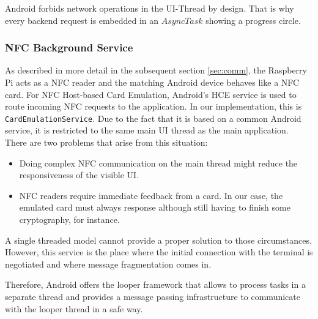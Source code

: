 Android forbids network operations in the UI-Thread by design. That is why every backend request is embedded in an $AsyncTask$ showing a progress circle.

\subsubsection{NFC Background Service}
As described in more detail in the subsequent section \ref{sec:comm}, the Raspberry Pi acts as a NFC reader and the matching Android device behaves like a NFC card.
For NFC Host-based Card Emulation, Android's HCE service is used to route incoming NFC requests to the \app application. In our implementation, this is \texttt{CardEmulationService}.
Due to the fact that it is based on a common Android service, it is restricted to the same main UI thread as the main application.
There are two problems that arise from this situation:
%
\begin{itemize}
	\item Doing complex NFC communication on the main thread might reduce the responsiveness of the visible UI.
	\item NFC readers require immediate feedback from a card. In our case, the emulated card must always response although still having to finish some cryptography, for instance.
\end{itemize}
%
A single threaded model cannot provide a proper solution to those circumstances.
However, this service is the place where the initial connection with the terminal is negotiated and where message fragmentation comes in.

Therefore, Android offers the looper framework that allows to process tasks in a separate thread and provides a message passing infrastructure to communicate with the looper thread in a safe way.

